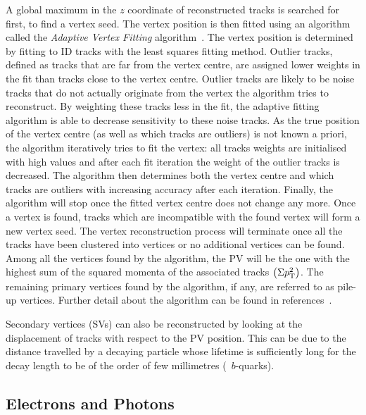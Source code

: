 			A global maximum in the $z$ coordinate of reconstructed tracks is searched for first, to find a vertex seed. The vertex position is then fitted using an algorithm called the \emph{Adaptive Vertex Fitting} algorithm~\cite{ATL-PHYS-PUB-2015-026,Fruhwirth:2007hz}. The vertex position is determined by fitting to \ac{ID} tracks with the least squares fitting method. Outlier tracks, defined as tracks that are far from the vertex centre, are assigned lower weights in the fit than tracks close to the vertex centre. Outlier tracks are likely to be noise tracks that do not actually originate from the vertex the algorithm tries to reconstruct. By weighting these tracks less in the fit, the adaptive fitting algorithm is able to decrease sensitivity to these noise tracks. As the true position of the vertex centre (as well as which tracks are outliers) is not known a priori, the algorithm iteratively tries to fit the vertex: all tracks weights are initialised with high values and after each fit iteration the weight of the outlier tracks is decreased. The algorithm then determines both the vertex centre and which tracks are outliers with increasing accuracy after each iteration. Finally, the algorithm will stop once the fitted vertex centre does not change any more. Once a vertex is found, tracks which are incompatible with the found vertex will form a new vertex seed. The vertex reconstruction process will terminate once all the tracks have been clustered into vertices or no additional vertices can be found. Among all the vertices found by the algorithm, the \ac{PV} will be the one with the highest sum of the squared momenta of the associated tracks $\left ( \Sigma p_{\mathrm{T}}^2 \right)$. The remaining primary vertices found by the algorithm, if any, are referred to as pile-up vertices. Further detail about the algorithm can be found in references~\cite{ATL-PHYS-PUB-2015-026,Fruhwirth:2007hz}. 

			Secondary vertices (\acs{SV}s) can also be reconstructed by looking at the displacement of tracks with respect to the \ac{PV} position. This can be due to the distance travelled by a decaying particle whose lifetime is sufficiently long for the decay length to be of the order of few millimetres (\eg\ $b$-quarks).


		\subsection*{Electrons and Photons}

